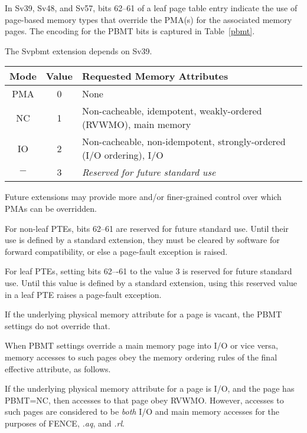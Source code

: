 In Sv39, Sv48, and Sv57, bits 62--61 of a leaf page table entry indicate the use
of page-based memory types that override the PMA(s) for the associated memory
pages.  The encoding for the PBMT bits is captured in Table~\ref{pbmt}.

The Svpbmt extension depends on Sv39.

\begin{table*}[h!]
\begin{center}
\begin{tabular}{|c|c|l|}
\hline
Mode & Value  & Requested Memory Attributes \\
\hline
PMA  & 0      & None \\
NC   & 1      & Non-cacheable, idempotent, weakly-ordered (RVWMO), main memory \\
IO   & 2      & Non-cacheable, non-idempotent, strongly-ordered (I/O ordering), I/O \\
$-$  & 3      & {\em Reserved for future standard use} \\
\hline
\end{tabular}
\end{center}
\caption{Encodings for the PBMT field in Sv39, Sv48, and Sv57 PTEs.  Attributes
not mentioned are inherited from the PMA associated with the physical address.}
\label{pbmt}
\end{table*}

\begin{commentary}
Future extensions may provide more and/or finer-grained control over which PMAs
can be overridden.
\end{commentary}

For non-leaf PTEs, bits 62--61 are reserved for future standard use.  Until
their use is defined by a standard extension, they must be cleared by software
for forward compatibility, or else a page-fault exception is raised.

For leaf PTEs, setting bits 62–-61 to the value 3 is reserved for future
standard use.
Until this value is defined by a standard extension, using this reserved value
in a leaf PTE raises a page-fault exception.

If the underlying physical memory attribute for a page is vacant, the PBMT settings do not override that.

When PBMT settings override a main memory page into I/O or vice versa, memory
accesses to such pages obey the memory ordering rules of the final effective
attribute, as follows.

If the underlying physical memory attribute for a page is I/O, and the page has
PBMT=NC, then accesses to that page obey RVWMO.
However, accesses to such pages are
considered to be {\em both} I/O and main memory accesses for the purposes of FENCE,
{\em.aq}, and {\em.rl}.

